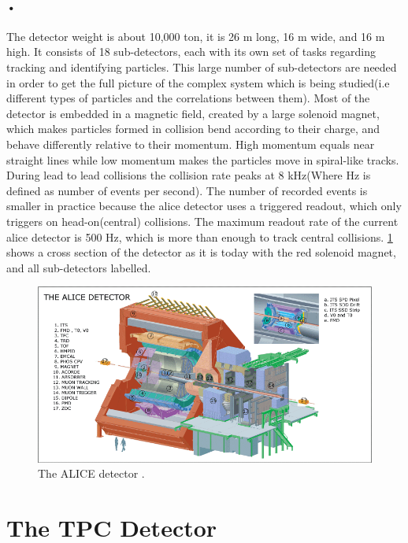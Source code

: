 \documentclass[a4paper, 12pt, openright, twoside]{report}
\begin{document}
\paragraph{•}
The detector weight is about 10,000 ton, it is 26 m long, 16 m wide, and 16 m high\cite{alice-about}.
It consists of 18 sub-detectors, each with its own set of tasks regarding tracking and identifying particles.
This large number of sub-detectors are needed in order to get the full picture of the complex system which is being studied(i.e different types of particles and the correlations between them).
Most of the detector is embedded in a magnetic field, created by a large solenoid magnet, which makes particles formed in collision bend according to their charge, and behave differently relative to their momentum. High momentum equals near straight lines while low momentum makes the particles move in spiral-like tracks.
During lead to lead collisions the collision rate peaks at 8 kHz(Where Hz is defined as number of events per second).
The number of recorded events is smaller in practice because the \gls{alice} detector uses a triggered readout, which only triggers on head-on(central) collisions.
The maximum readout rate of the current \gls{alice} detector is 500 Hz, which is more than enough to track central collisions.
\ref{fig:alice} shows a cross section of the detector as it is today with the red solenoid magnet, and all sub-detectors labelled.

\begin{figure}[h!]
  \centering
    \includegraphics[width=1.0\textwidth]{images/alice-detector.png}
     \caption[The ALICE detector]{The ALICE detector \cite{alice-image}.}
    \label{fig:alice}
\end{figure}

\section{The TPC Detector}
\end{document}
